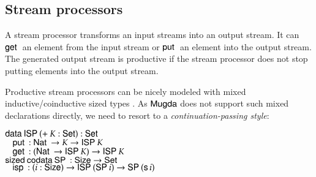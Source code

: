 \subsection{Stream processors}

A stream processor \cite{journals/entcs/GhaniHP06} transforms an input streams into an output stream.
It can $\mathsf{get}\:$ an element from the input stream or $\mathsf{put}\:$ an element into the output stream.
The generated output stream is productive if the stream processor does not stop putting elements into the output stream.

Productive stream processors can be nicely modeled with mixed in\-ductive/coinductive sized types \cite{abel:aplas07}. 
As $\textsf{Mugda}$ does not support such mixed declarations directly, we need to resort to a \emph{continuation-passing style}:
\begin{bsp}
$\mathsf{data}\: \mathsf{ISP}\: ( + \: K : \mathsf{Set}) : \mathsf{Set}$\\
$\hspace*{3mm} \mathsf{put}\: : \mathsf{Nat}\: \rightarrow K \rightarrow \mathsf{ISP}\: K$ \\
$\hspace*{3mm} \mathsf{get}\: : (\mathsf{Nat}\: \rightarrow \mathsf{ISP}\: K) \rightarrow \mathsf{ISP}\: K $ \\

$\mathsf{sized}\: \mathsf{codata}\: \mathsf{SP}\: : \mathsf{Size} \rightarrow \mathsf{Set}$\\
$\hspace*{3mm} \mathsf{isp}\: : (i : \mathsf{Size}) \rightarrow \mathsf{ISP}\: (\mathsf{SP}\: i) \rightarrow \mathsf{SP}\: (\mathsf{s}\, i)$
\end{bsp}

